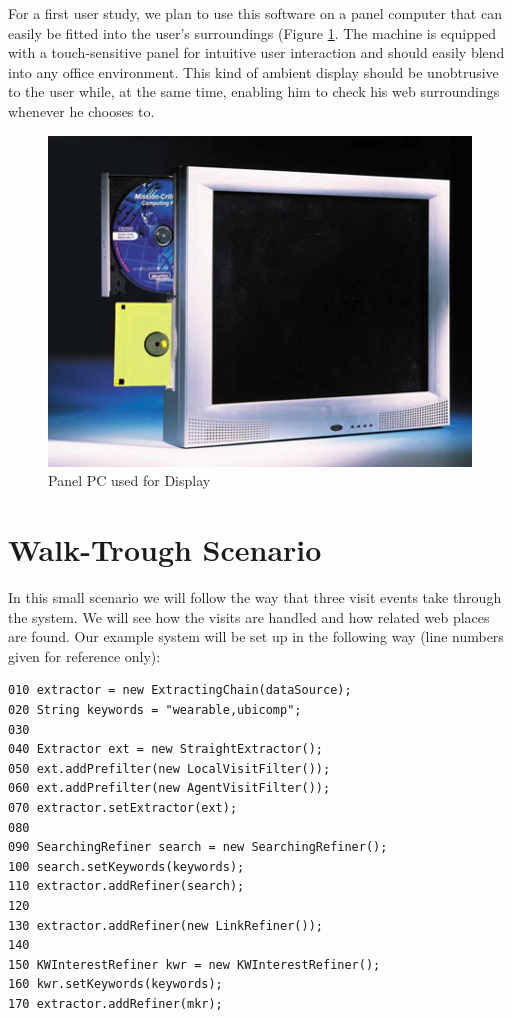 \documentclass[a4paper,twoside]{danarticle}
\theoremstyle{remark}
\begin{document}
      For a first user study, we plan to use this software on a panel computer 
      that can easily be fitted into the user's surroundings (Figure \ref{ppc}. 
      The machine is 
      equipped with a touch-sensitive panel for intuitive user interaction and 
      should easily blend into any office environment. This kind of ambient 
      display should be unobtrusive to the user while, at the same time, enabling 
      him to check his web surroundings whenever he chooses to.
      \begin{figure}[ht]
        \centering
        \includegraphics[width=12cm]{ppc}
        \caption{Panel PC used for Display}
        \label{ppc}
      \end{figure}
  \section{Walk-Trough Scenario}
    In this small scenario we will follow the way that three visit events take    
    through the system. We will see how the visits are handled and how related 
    web places are found. Our example system will be set up in the following 
    way (line numbers given for reference only):
    \begin{verbatim}
010 extractor = new ExtractingChain(dataSource);
020 String keywords = "wearable,ubicomp";
030  
040 Extractor ext = new StraightExtractor();
050 ext.addPrefilter(new LocalVisitFilter());
060 ext.addPrefilter(new AgentVisitFilter());
070 extractor.setExtractor(ext);
080        
090 SearchingRefiner search = new SearchingRefiner();
100 search.setKeywords(keywords);
110 extractor.addRefiner(search);
120        
130 extractor.addRefiner(new LinkRefiner());
140                
150 KWInterestRefiner kwr = new KWInterestRefiner(); 
160 kwr.setKeywords(keywords); 
170 extractor.addRefiner(mkr); 
      \end{verbatim} 
      
\end{document}
